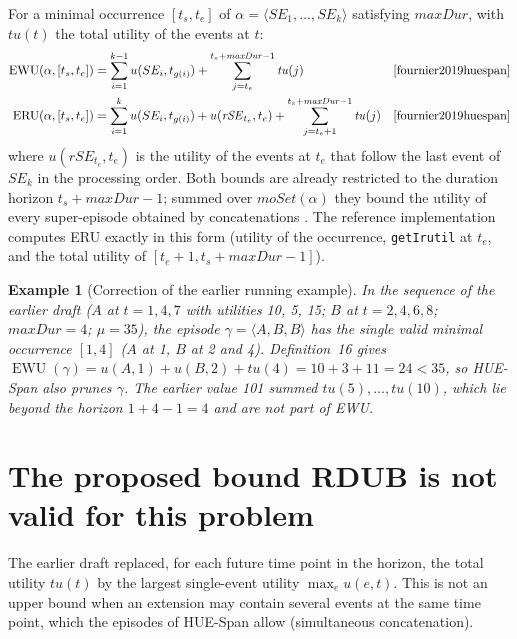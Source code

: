 \documentclass[11pt]{article}
\newtheorem{example}{Example}
\newcommand{\EWU}{\operatorname{EWU}}
\newcommand{\ERU}{\operatorname{ERU}}
\newcommand{\HUESpan}{\textsf{HUE-Span}}
\begin{document}
For a minimal occurrence $[t_s, t_e]$ of $\alpha = \langle SE_1, \dots, SE_k\rangle$ satisfying $\mathit{maxDur}$, with $\mathit{tu}(t)$ the total utility of the events at $t$:
\begin{align}
\EWU(\alpha, [t_s, t_e]) &= \sum_{i=1}^{k-1} u(SE_i, t_{g(i)}) + \sum_{j=t_e}^{t_s + \mathit{maxDur} - 1} \mathit{tu}(j) && \text{\cite[Def.~16]{fournier2019huespan}}\\
\ERU(\alpha, [t_s, t_e]) &= \sum_{i=1}^{k} u(SE_i, t_{g(i)}) + u(\mathit{rSE}_{t_e}, t_e) + \sum_{j=t_e+1}^{t_s + \mathit{maxDur} - 1} \mathit{tu}(j) && \text{\cite[Def.~18]{fournier2019huespan}}
\end{align}
where $u(\mathit{rSE}_{t_e}, t_e)$ is the utility of the events at $t_e$ that follow the last event of $SE_k$ in the processing order. Both bounds are already restricted to the duration horizon $t_s + \mathit{maxDur} - 1$; summed over $\mathit{moSet}(\alpha)$ they bound the utility of every super-episode obtained by concatenations \cite[Lemma~1]{fournier2019huespan}. The reference implementation computes ERU exactly in this form (utility of the occurrence, \texttt{getIrutil} at $t_e$, and the total utility of $[t_e + 1, t_s + \mathit{maxDur} - 1]$).

\begin{example}[Correction of the earlier running example]
In the sequence of the earlier draft ($A$ at $t=1,4,7$ with utilities 10, 5, 15; $B$ at $t=2,4,6,8$; $\mathit{maxDur} = 4$; $\mu = 35$), the episode $\gamma = \langle A, B, B\rangle$ has the single valid minimal occurrence $[1,4]$ ($A$ at 1, $B$ at 2 and 4). Definition~16 gives $\EWU(\gamma) = u(A,1) + u(B,2) + \mathit{tu}(4) = 10 + 3 + 11 = 24 < 35$, so \HUESpan{} also prunes $\gamma$. The earlier value 101 summed $\mathit{tu}(5), \dots, \mathit{tu}(10)$, which lie beyond the horizon $1 + 4 - 1 = 4$ and are not part of EWU.
\end{example}

\section{The proposed bound RDUB is not valid for this problem}\label{sec:rdub}

The earlier draft replaced, for each future time point in the horizon, the total utility $\mathit{tu}(t)$ by the largest single-event utility $\max_{e} u(e, t)$. This is not an upper bound when an extension may contain several events at the same time point, which the episodes of \HUESpan{} allow (simultaneous concatenation).
\end{document}
